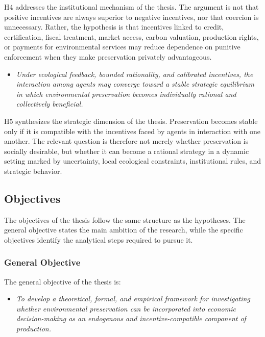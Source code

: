 H4 addresses the institutional mechanism of the thesis. The argument is not that positive incentives are always superior to negative incentives, nor that coercion is unnecessary. Rather, the hypothesis is that incentives linked to credit, certification, fiscal treatment, market access, carbon valuation, production rights, or payments for environmental services may reduce dependence on punitive enforcement when they make preservation privately advantageous.

\begin{itemize}

    \item[\textbf{H5.}]
    
    \textit{Under ecological feedback, bounded rationality, and calibrated incentives, the interaction among agents may converge toward a stable strategic equilibrium in which environmental preservation becomes individually rational and collectively beneficial.}

\end{itemize}

H5 synthesizes the strategic dimension of the thesis. Preservation becomes stable only if it is compatible with the incentives faced by agents in interaction with one another. The relevant question is therefore not merely whether preservation is socially desirable, but whether it can become a rational strategy in a dynamic setting marked by uncertainty, local ecological constraints, institutional rules, and strategic behavior.

\subsection{Objectives}

The objectives of the thesis follow the same structure as the hypotheses. The general objective states the main ambition of the research, while the specific objectives identify the analytical steps required to pursue it.

\subsubsection{General Objective}

The general objective of the thesis is:

\begin{itemize}

    \item[\textbf{G0.}]
    
    \textit{To develop a theoretical, formal, and empirical framework for investigating whether environmental preservation can be incorporated into economic decision-making as an endogenous and incentive-compatible component of production.}

\end{itemize}

